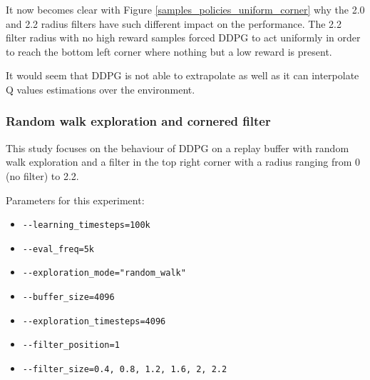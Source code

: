 \documentclass{article}
\begin{document}
It now becomes clear with Figure \ref{samples_policies_uniform_corner} why the 2.0 and 2.2 radius filters have such different impact on the performance. The 2.2 filter radius with no high reward samples forced DDPG to act uniformly in order to reach the bottom left corner where nothing but a low reward is present.

It would seem that DDPG is not able to extrapolate as well as it can interpolate Q values estimations over the environment.

\subsubsection{Random walk exploration and cornered filter}

This study focuses on the behaviour of DDPG on a replay buffer with random walk exploration and a filter in the top right corner with a radius ranging from 0 (no filter) to 2.2.

Parameters for this experiment:
\begin{itemize}
    \item[] \lstinline|--learning_timesteps=100k|
    \item[] \lstinline|--eval_freq=5k|
    \item[] \lstinline|--exploration_mode="random_walk"|
    \item[] \lstinline|--buffer_size=4096|
    \item[] \lstinline|--exploration_timesteps=4096|
    \item[] \lstinline|--filter_position=1|
    \item[] \lstinline|--filter_size=0.4, 0.8, 1.2, 1.6, 2, 2.2|
\end{itemize}
\end{document}
